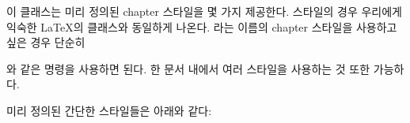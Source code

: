 이 클래스는 미리 정의된 chapter 스타일을 몇 가지 제공한다.
 스타일의 경우 우리에게 익숙한 \LaTeX{}의  클래스와
동일하게 나온다.
 라는 이름의 chapter 스타일을 사용하고 싶은 경우 단순히
\begin{lcode}
\end{lcode}
와 같은 명령을 사용하면 된다. 한 문서 내에서 여러 스타일을 사용하는 것 또한 가능하다.

미리 정의된 간단한 스타일들은 아래와 같다:

